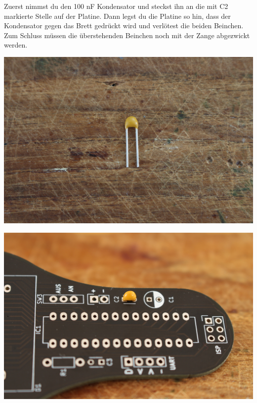 \documentclass{article}
\begin{document}
Zuerst nimmst du den 100 nF Kondensator und steckst ihn an die mit C2 markierte Stelle auf der Platine.
Dann legst du die Platine so hin, dass der Kondensator gegen das Brett gedrückt wird und verlötest die beiden Beinchen.
Zum Schluss müssen die überstehenden Beinchen noch mit der Zange abgezwickt werden.

\vspace{1cm}

\begin{minipage}[b]{0.5\textwidth}
	\includegraphics[width=\textwidth]{Bilder2022/IMG_8185.JPG}
\end{minipage}
\begin{minipage}[b]{0.5\textwidth}
	\includegraphics[width=\textwidth]{Bilder2022/IMG_8186.JPG}
\end{minipage}
\end{document}
